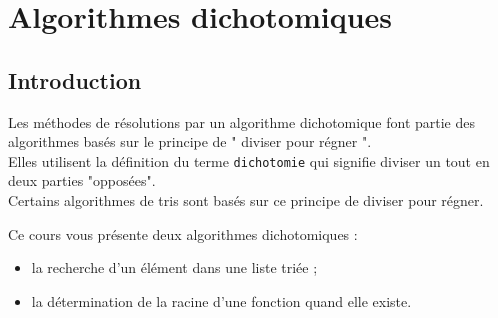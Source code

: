 \def\xxactivite{Cours}

\def\xxauteur{Xavier Pessoles}
\fichefalse \proftrue \tdfalse \courstrue

\def\xxnumchapitre{Chapitre 5 \vspace{.2cm}}
\def\xxchapitre{\hspace{.12cm} Algorithmes dichotomiques et algorithmes gloutons}

\def\xxcompetences{%
\textsl{%
\textbf{Savoirs et compétences :}\\
\begin{itemize}[label=\ding{112},font=\color{bleuxp}] 
\item Algorithmes dichotomiques.
\end{itemize}
}}

\def\xxfigures{
}%


\setlength{\columnseprule}{.1pt}

\vspace{2cm}
\pagestyle{fancy}
\thispagestyle{plain}



\section{Algorithmes dichotomiques}
\subsection{Introduction}
Les méthodes de résolutions par un algorithme dichotomique font partie des algorithmes basés sur le principe de " diviser pour régner ".\\
Elles utilisent la définition du terme \texttt{dichotomie} qui signifie diviser un tout en deux parties "opposées".\\
Certains algorithmes de tris sont basés sur ce principe de diviser pour régner.



Ce cours vous présente deux algorithmes dichotomiques :
\begin{itemize}
\item la recherche d'un élément dans une liste triée ;
\item la détermination de la racine d'une fonction quand elle existe.
\end{itemize}

